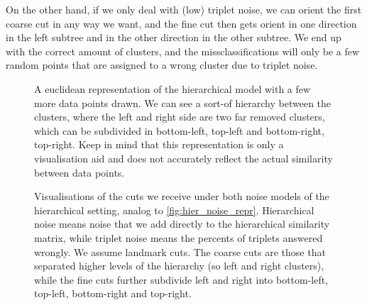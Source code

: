 On the other hand, if we only deal with (low) triplet noise, we can orient the first coarse cut in any way we want, and the fine cut then gets orient in one direction in the left subtree
and in the other direction in the other subtree. We end up with the correct amount of clusters, and the missclassifications will only be a few random points that are assigned to a wrong cluster 
due to triplet noise.


\begin{figure}[ht]
    \centering
    \resizebox{0.8\textwidth}{!}{}
    \caption{
        A euclidean representation of the hierarchical model with a few more data points drawn. We can see a sort-of hierarchy between the clusters, where
        the left and right side are two far removed clusters, which can be subdivided in bottom-left, top-left and bottom-right, top-right.
        Keep in mind that this representation is only a visualisation aid and does not accurately reflect the actual similarity between data points.
    }
    \label{fig:hier_noise_repr}
\end{figure}


\onecolumn
\begin{figure}[ht]
    \centering
    \hfill
    \caption{
        Visualisations of the cuts we receive under both noise models of the hierarchical setting, analog to \autoref{fig:hier_noise_repr}.
        Hierarchical noise means noise that we add directly to the hierarchical similarity matrix, while triplet noise means the 
        percents of triplets answered wrongly. We assume landmark cuts. The coarse cuts are those that separated higher levels of the hierarchy (so left and right clusters), while
        the fine cuts further subdivide left and right into bottom-left, top-left, bottom-right and top-right.
    }
    \label{fig:hier_noise_cuts}
\end{figure}

